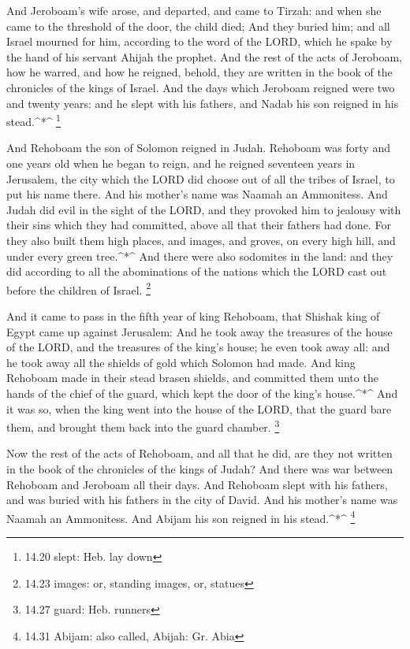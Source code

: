  And Jeroboam's wife arose, and departed, and came to
Tirzah: and when she came to the threshold of the door, the child died;
 And they buried him; and all Israel mourned for him,
according to the word of the LORD, which he spake by the hand of his
servant Ahijah the prophet.  And the rest of the acts of
Jeroboam, how he warred, and how he reigned, behold, they are written in
the book of the chronicles of the kings of Israel.  And the
days which Jeroboam reigned were two and twenty years: and he slept with
his fathers, and Nadab his son reigned in his stead.\^{}*\^{}
\footnote{14.20 slept: Heb. lay down}

 And Rehoboam the son of Solomon reigned in Judah. Rehoboam
was forty and one years old when he began to reign, and he reigned
seventeen years in Jerusalem, the city which the LORD did choose out of
all the tribes of Israel, to put his name there. And his mother's name
was Naamah an Ammonitess.  And Judah did evil in the sight
of the LORD, and they provoked him to jealousy with their sins which
they had committed, above all that their fathers had done. 
For they also built them high places, and images, and groves, on every
high hill, and under every green tree.\^{}*\^{}  And there
were also sodomites in the land: and they did according to all the
abominations of the nations which the LORD cast out before the children
of Israel. \footnote{14.23 images: or, standing images, or, statues}

 And it came to pass in the fifth year of king Rehoboam,
that Shishak king of Egypt came up against Jerusalem:  And
he took away the treasures of the house of the LORD, and the treasures
of the king's house; he even took away all: and he took away all the
shields of gold which Solomon had made.  And king Rehoboam
made in their stead brasen shields, and committed them unto the hands of
the chief of the guard, which kept the door of the king's
house.\^{}*\^{}  And it was so, when the king went into the
house of the LORD, that the guard bare them, and brought them back into
the guard chamber. \footnote{14.27 guard: Heb. runners}

 Now the rest of the acts of Rehoboam, and all that he did,
are they not written in the book of the chronicles of the kings of
Judah?  And there was war between Rehoboam and Jeroboam all
their days.  And Rehoboam slept with his fathers, and was
buried with his fathers in the city of David. And his mother's name was
Naamah an Ammonitess. And Abijam his son reigned in his stead.\^{}*\^{}
\footnote{14.31 Abijam: also called, Abijah: Gr. Abia}

